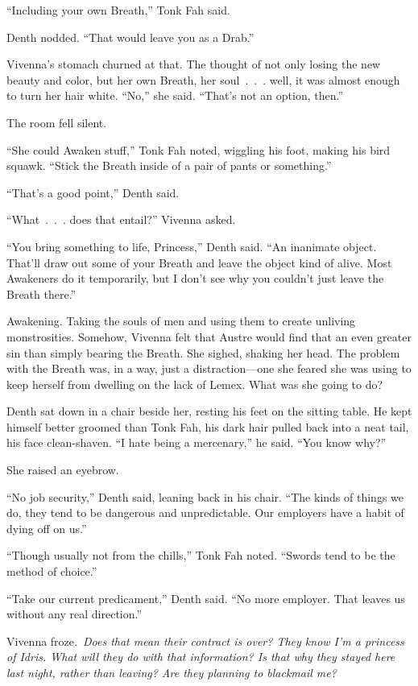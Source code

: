 “Including your own Breath,” Tonk Fah said.

Denth nodded. “That would leave you as a Drab.”

Vivenna’s stomach churned at that. The thought of not only losing the new beauty and color, but her own Breath, her soul~.~.~. well, it was almost enough to turn her hair white. “No,” she said. “That’s not an option, then.”

The room fell silent.

“She could Awaken stuff,” Tonk Fah noted, wiggling his foot, making his bird squawk. “Stick the Breath inside of a pair of pants or something.”

“That’s a good point,” Denth said.

“What~.~.~. does that entail?” Vivenna asked.

“You bring something to life, Princess,” Denth said. “An inanimate object. That’ll draw out some of your Breath and leave the object kind of alive. Most Awakeners do it temporarily, but I don’t see why you couldn’t just leave the Breath there.”

Awakening. Taking the souls of men and using them to create unliving monstrosities. Somehow, Vivenna felt that Austre would find that an even greater sin than simply bearing the Breath. She sighed, shaking her head. The problem with the Breath was, in a way, just a distraction—one she feared she was using to keep herself from dwelling on the lack of Lemex. What was she going to do?

Denth sat down in a chair beside her, resting his feet on the sitting table. He kept himself better groomed than Tonk Fah, his dark hair pulled back into a neat tail, his face clean-shaven. “I hate being a mercenary,” he said. “You know why?”

She raised an eyebrow.

“No job security,” Denth said, leaning back in his chair. “The kinds of things we do, they tend to be dangerous and unpredictable. Our employers have a habit of dying off on us.”

“Though usually not from the chills,” Tonk Fah noted. “Swords tend to be the method of choice.”

“Take our current predicament,” Denth said. “No more employer. That leaves us without any real direction.”

Vivenna froze.~\textit{Does that mean their contract is over? They know I’m a princess of Idris. What will they do with that information? Is that why they stayed here last night, rather than leaving? Are they planning to blackmail me?}

